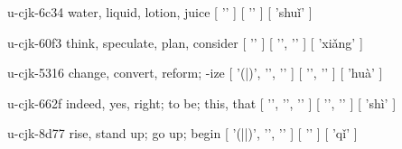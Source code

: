 \begin{multicols}{2}
\cjkgGlue{} u-cjk-6c34  water, liquid, lotion, juice  [ '\cjkgGlue{}' ]  [ '\cjkgGlue{}' ]  [ 'shu{\mktsRsgFb{}ǐ}' ] 

\cjkgGlue{} u-cjk-60f3  think, speculate, plan, consider  [ '\cjkgGlue{}' ]  [ '\cjkgGlue{}', '\cjkgGlue{}' ]  [ 'xi{\mktsRsgFb{}ǎ}ng' ] 

\cjkgGlue{} u-cjk-5316  change, convert, reform; -ize  [ '\cjkgGlue{}(\cjkgGlue{}|\cjkgGlue{})', '\cjkgGlue{}', '\cjkgGlue{}' ]  [ '\cjkgGlue{}', '\cjkgGlue{}' ]  [ 'huà' ] 

\cjkgGlue{} u-cjk-662f  indeed, yes, right; to be; this, that  [ '\cjkgGlue{}', '\cjkgGlue{}', '\cjkgGlue{}' ]  [ '\cjkgGlue{}', '\cjkgGlue{}' ]  [ 'shì' ] 

\cjkgGlue{} u-cjk-8d77  rise, stand up; go up; begin  [ '\cjkgGlue{}(\cjkgGlue{}|\cjkgGlue{}|\cjkgGlue{})', '\cjkgGlue{}', '\cjkgGlue{}' ]  [ '\cjkgGlue{}' ]  [ 'q{\mktsRsgFb{}ǐ}' ] 



\end{multicols}



